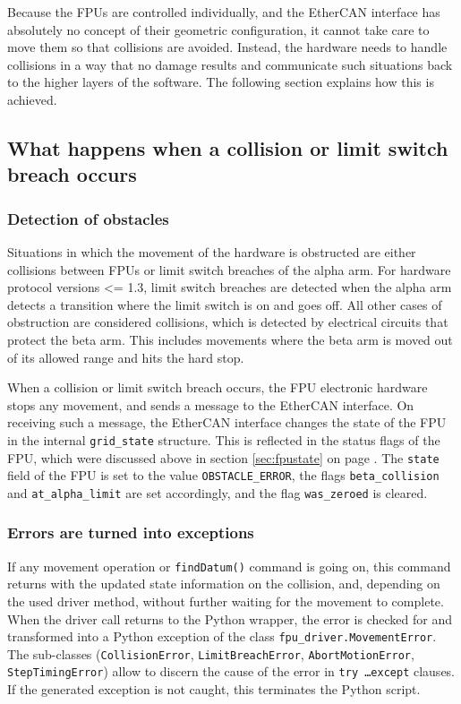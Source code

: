 \documentclass[11pt,a4paper]{report}
\begin{document}
Because the FPUs are controlled individually, and the  EtherCAN interface
has absolutely no concept of their geometric configuration, it cannot
take care to move them so that collisions are avoided.  Instead, the
hardware needs to handle collisions in a way that no damage results
and communicate such situations back to the higher layers of the
software. The following section explains how this is achieved.

\subsection{What happens when a collision or limit switch breach occurs}
\subsubsection{Detection of obstacles}

Situations in which the movement of the hardware is obstructed are
either collisions between FPUs or limit switch breaches of the alpha
arm. For hardware protocol versions <= 1.3, limit switch breaches are
detected when the alpha arm detects a transition where the limit
switch is on and goes off. All other cases of obstruction are
considered collisions, which is detected by electrical circuits that
protect the beta arm. This includes movements where the beta arm is
moved out of its allowed range and hits the hard stop.

When a collision or limit switch breach occurs, the FPU electronic
hardware stops any movement, and sends a message to the EtherCAN interface. On
receiving such a message, the EtherCAN interface changes the state of the FPU in
the internal \texttt{grid\_state} structure. This is reflected in the
status flags of the FPU, which were discussed above in section
\ref{sec:fpustate} on page \pageref{sec:fpustate}.  The \texttt{state}
field of the FPU is set to the value \texttt{OBSTACLE\_ERROR}, the
flags \texttt{beta\_collision} and \texttt{at\_alpha\_limit} are set
accordingly, and the flag \texttt{was\_zeroed} is cleared.


\subsubsection{Errors are turned into exceptions}

\begin{sloppypar}
If any movement operation or \texttt{findDatum()} command is going on,
this command returns with the updated state information on the
collision, and, depending on the used driver method, without further
waiting for the movement to complete.  When the driver call returns to
the Python wrapper, the error is checked for and transformed into a
Python exception of the class \texttt{fpu\_driver.MovementError}. The
sub-classes (\texttt{CollisionError}, \texttt{LimitBreachError},
\texttt{AbortMotionError}, \texttt{StepTimingError}) allow to discern
the cause of the error in \texttt{try \ldots except} clauses.  If the
generated exception is not caught, this terminates the Python script.
\end{sloppypar}
\end{document}
